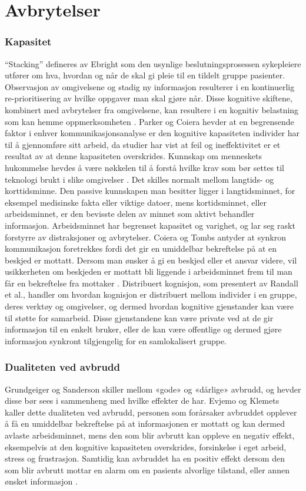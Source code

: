 \section{Avbrytelser}
\label{chp: avbrytelser} 

\subsubsection{Kapasitet}
“Stacking” defineres av Ebright som den usynlige beslutningsprosessen sykepleiere utfører om hva, hvordan og når de skal gi pleie til en tildelt gruppe pasienter. Observasjon av omgivelsene og stadig ny informasjon resulterer i en kontinuerlig re-prioritisering av hvilke oppgaver man skal gjøre når. Disse kognitive skiftene, kombinert med avbrytelser fra omgivelsene, kan resultere i en kognitiv belastning som kan hemme oppmerksomheten \cite{Ebright10}. Parker og Coiera hevder at en begrensende faktor i enhver kommunikasjonsanalyse er den kognitive kapasiteten individer har til å gjennomføre sitt arbeid, da studier har vist at feil og ineffektivitet er et resultat av at denne kapasiteten overskrides. Kunnskap om menneskets hukommelse hevdes å være nøkkelen til å forstå hvilke krav som bør settes til teknologi brukt i slike omgivelser \cite{Parker00}.
Det skilles normalt mellom langtids- og korttidsminne. Den passive kunnskapen man besitter ligger i langtidsminnet, for eksempel medisinske fakta eller viktige datoer, mens kortidsminnet, eller arbeidsminnet, er den bevisste delen av minnet som aktivt behandler informasjon. Arbeidsminnet har begrenset kapasitet og varighet, og lar seg raskt forstyrre av distraksjoner og avbrytelser. Coiera og Tombs antyder at synkron kommunikasjon foretrekkes fordi det gir en umiddelbar bekreftelse på at en beskjed er mottatt. Dersom man ønsker å gi en beskjed eller et ansvar videre, vil usikkerheten om beskjeden er mottatt bli liggende i arbeidsminnet frem til man får en bekreftelse fra mottaker \cite{Parker00}. 
Distribuert kognisjon, som presentert av Randall et al., handler om hvordan kognisjon er distribuert mellom individer i en gruppe, deres verktøy og omgivelser, og dermed hvordan kognitive gjenstander kan være til støtte for samarbeid. Disse gjenstandene kan være private ved at de gir informasjon til en enkelt bruker, eller de kan være offentlige og dermed gjøre informasjon synkront tilgjengelig for en samlokalisert gruppe.  

\subsubsection{Dualiteten ved avbrudd}
Grundgeiger og Sanderson skiller mellom «gode» og «dårlige» avbrudd, og hevder disse bør sees i sammenheng med hvilke effekter de har. Evjemo og Klemets kaller dette dualiteten ved avbrudd, personen som forårsaker avbruddet opplever å få en umiddelbar bekreftelse på at informasjonen er mottatt og kan dermed avlaste arbeidsminnet, mens den som blir avbrutt kan oppleve en negativ effekt, eksempelvis at den kognitive kapasiteten overskrides, forsinkelse i eget arbeid, stress og frustrasjon. Samtidig kan avbruddet ha en positiv effekt dersom den som blir avbrutt mottar en alarm om en pasients alvorlige tilstand, eller annen ønsket informasjon \cite{Evjemo, Grundgeiger09}. 

